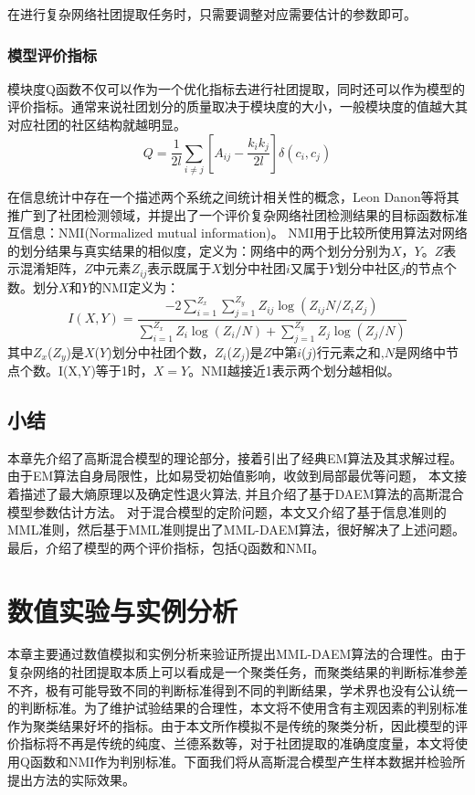\documentclass[a4paper,12pt,openany,oneside,utf-8]{ctexbook}
\newcommand{\xiaowuhao}{\fontsize{9pt}{\baselineskip}\selectfont}
\begin{document}
	在进行复杂网络社团提取任务时，只需要调整对应需要估计的参数即可。
	
    \subsection{模型评价指标}
   
    模块度Q函数不仅可以作为一个优化指标去进行社团提取，同时还可以作为模型的评价指标。通常来说社团划分的质量取决于模块度的大小，一般模块度的值越大其对应社团的社区结构就越明显。
    \begin{equation}
        Q=\frac{1}{2l}\sum_{i\neq j}[A_{i j}-\frac{k_i k_j}{2l}]\delta(c_i,c_j)
    \end{equation}
    
    在信息统计中存在一个描述两个系统之间统计相关性的概念，Leon Danon\cite{ref35}等将其推广到了社团检测领域，并提出了一个评价复杂网络社团检测结果的目标函数标准互信息：NMI(Normalized mutual information)。 NMI用于比较所使用算法对网络的划分结果与真实结果的相似度，定义为：网络中的两个划分分别为$X$，$Y$。$Z$表示混淆矩阵，$Z$中元素$Z_{i j}$表示既属于$X$划分中社团$i$又属于$Y$划分中社区$j$的节点个数。划分$X$和$Y$的NMI定义为：
    \begin{equation}
        I(X,Y)=\frac{-2\sum_{i=1}^{Z_x}\sum_{j=1}^{Z_y}Z_{i j}\log (Z_{i j}N/Z_i Z_j)}{\sum_{i=1}^{Z_x}Z_i\log(Z_i/N)+\sum_{j=1}^{Z_y}Z_j\log(Z_j/N)}
    \end{equation}
    其中$Z_x$($Z_y$)是$X$($Y$)划分中社团个数，$Z_i$($Z_j$)是$Z$中第$i$($j$)行元素之和,$N$是网络中节点个数。I(X,Y)等于1时，$X=Y$。NMI越接近1表示两个划分越相似。
    
	\section{小结}
	本章先介绍了高斯混合模型的理论部分，接着引出了经典EM算法及其求解过程。 由于EM算法自身局限性，比如易受初始值影响，收敛到局部最优等问题， 本文接着描述了最大熵原理以及确定性退火算法, 并且介绍了基于DAEM算法的高斯混合模型参数估计方法。 对于混合模型的定阶问题，本文又介绍了基于信息准则的MML准则，然后基于MML准则提出了MML-DAEM算法，很好解决了上述问题。最后，介绍了模型的两个评价指标，包括Q函数和NMI。
	
	
	
	
	\chapter[数值实验与实例分析]{数值实验与实例分析}\fancyhead[C]{\xiaowuhao}
	本章主要通过数值模拟和实例分析来验证所提出MML-DAEM算法的合理性。由于复杂网络的社团提取本质上可以看成是一个聚类任务，而聚类结果的判断标准参差不齐，极有可能导致不同的判断标准得到不同的判断结果，学术界也没有公认统一的判断标准。为了维护试验结果的合理性，本文将不使用含有主观因素的判别标准作为聚类结果好坏的指标。由于本文所作模拟不是传统的聚类分析，因此模型的评价指标将不再是传统的纯度、兰德系数等，对于社团提取的准确度度量，本文将使用Q函数和NMI作为判别标准。下面我们将从高斯混合模型产生样本数据并检验所提出方法的实际效果。
	
\end{document}
